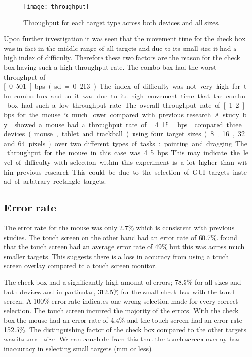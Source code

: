\documentclass{elsart}
\begin{document}
\begin{figure}
	\centering
	\texttt{[image: throughput]}
	\caption{Throughput for each target type across both devices and all
	sizes.}
	\label{fig-throughput}
\end{figure}

Upon further investigation it was seen that the movement time for the
check box was in fact in the middle range of all targets and due to its
small size it had a high index of difficulty. Therefore these two
factors are the reason for the check box having such a high throughput
rate. The combo box had the worst throughput of \unit[0.501]{bps} (sd =
0.213). The index of difficulty was not very high for the combo box and
so it was due to its high movement time that the combo box had such a
low throughput rate.

The overall throughput rate of \unit[1.2]{bps} for the mouse is much
lower compared with previous research. A study by
\citet{Doug-SA-1994-SIGCHI} showed a mouse had a throughput rate of
\unit[4.15]{bps}. \citet{Mack-IS-1991} compared three devices (mouse,
tablet and trackball) using four target sizes (8, 16, 32 and 64 pixels)
over two different types of tasks: pointing and dragging. The throughput
for the mouse in this case was 4.5 bps. This may indicate the level of
difficulty with selection within this experiment is a lot higher than
within previous research. This could be due to the selection of GUI
targets instead of arbitrary rectangle targets.

\subsection{Error rate}
\label{sec-results-errorrate}

The error rate for the mouse was only 2.7\% which is consistent with
previous studies. The touch screen on the other hand had an error rate
of 60.7\%. \citet{Sear-A-1991-IJMMS} found that the touch screen had
an average error rate of 49\% but this was across much smaller targets.
This suggests there is a loss in accuracy from using a touch screen
overlay compared to a touch screen monitor.

The check box had a significantly high amount of errors; 78.5\% for all
sizes and both devices and in particular, 312.5\% for the small check box
with the touch screen. A 100\% error rate indicates one wrong selection
made for every correct selection. The touch screen incurred the majority
of the errors. With the check box the mouse had an error rate of 4.4\%
and the touch screen had an error rate 152.5\%. The distinguishing factor
of the check box compared to the other targets was its small size. We
can conclude from this that the touch screen overlay has inaccuracy in
selecting small targets (\unit[4]{mm} or less).
\end{document}
